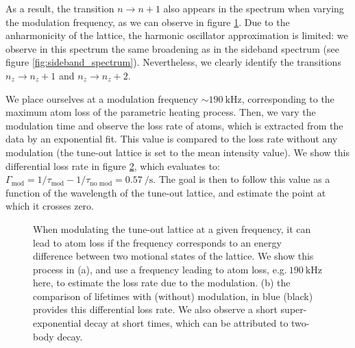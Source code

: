 \documentclass[11pt]{article}
\numberwithin{equation}{section}
\numberwithin{figure}{section}
\begin{document}
As a result, the transition $n \rightarrow n+1$ also appears in the spectrum when varying the modulation frequency, as we can observe in figure \ref{fig:para_heating_freq}. Due to the anharmonicity of the lattice, the harmonic oscillator approximation is limited: we observe in this spectrum the same broadening as in the sideband spectrum (see figure \ref{fig:sideband_spectrum}). Nevertheless, we clearly identify the transitions $n_z \rightarrow n_z+1$ and $n_z \rightarrow n_z+2$.

We place ourselves at a modulation frequency $\sim \SI{190}{\kilo\hertz}$, corresponding to the maximum atom loss of the parametric heating process. Then, we vary the modulation time and observe the loss rate of atoms, which is extracted from the data by an exponential fit. This value is compared to the loss rate without any modulation (the tune-out lattice is set to the mean intensity value). We show this differential loss rate in figure \ref{fig:para_heating_loss}, which evaluates to: $\Gamma_\text{mod} = 1/\tau_\text{mod} - 1/\tau_\text{no mod} = \SI{0.57}{\per\second}$. The goal is then to follow this value as a function of the wavelength of the tune-out lattice, and estimate the point at which it crosses zero.  

%
\begin{figure}[htbp]
	\centering
	\begin{subfigure}[b]{0.48\textwidth}
		\centering
		\small
   		
		\caption{\small }
		\label{fig:para_heating_freq}
	\end{subfigure}
	\hspace{0.4cm}
	\begin{subfigure}[b]{0.48\textwidth}
    	\centering
    	\small
   		
		\caption{\small }
		\label{fig:para_heating_loss}
	\end{subfigure}	
	\caption{\small When modulating the tune-out lattice at a given frequency, it can lead to atom loss if the frequency corresponds to an energy difference between two motional states of the lattice. We show this process in (a), and use a frequency leading to atom loss, e.g.$~\SI{190}{\kilo\hertz}$ here, to estimate the loss rate due to the modulation. (b) the comparison of lifetimes with (without) modulation, in blue (black) provides this differential loss rate. We also observe a short super-exponential decay at short times, which can be attributed to two-body decay.}
    \label{fig:para_heating}
\end{figure}
%
\end{document}
